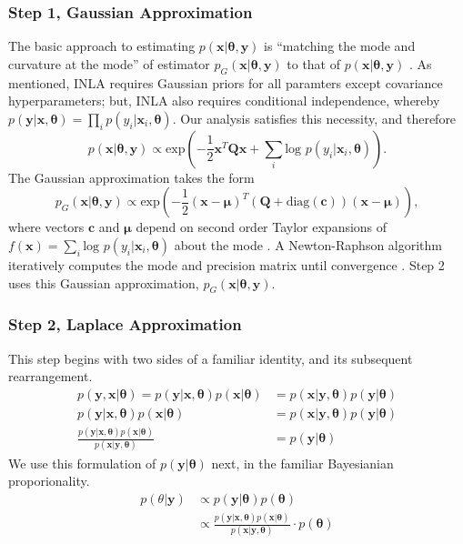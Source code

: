 \subsubsection*{Step 1, Gaussian Approximation} %

The basic approach to estimating $p(\pmb{x}|\pmb{\theta}, \pmb{y})$ is ``matching the mode and curvature at the mode'' of estimator $p_{G}(\pmb{x}|\pmb{\theta}, \pmb{y})$ to that of $p(\pmb{x}|\pmb{\theta}, \pmb{y})$ \citep{Rue2005}. As mentioned, INLA requires Gaussian priors for all paramters except covariance hyperparameters; but, INLA also requires conditional independence, whereby $p(\pmb{y}|\pmb{x}, \pmb{\theta}) = \prod_{i} p(y_{i}|\pmb{x}_{i},\pmb{\theta})$. Our analysis satisfies this necessity, and therefore $$p(\pmb{x}|\pmb{\theta},\pmb{y}) \propto \text{exp}\left(-\frac{1}{2}\pmb{x}^{T}\pmb{Q x} + \sum_{i} \text{log }p(y_{i}|\pmb{x}_{i},\pmb{\theta}) \right).$$ The Gaussian approximation takes the form
$$p_{G}(\pmb{x}|\pmb{\theta},\pmb{y}) \propto \text{exp} \left( -\frac{1}{2}(\pmb{x-\mu})^{T} (\pmb{Q} + \text{diag}(\pmb{c}) ) (\pmb{x - \mu}) \right),$$
where vectors $\pmb{c}$ and $\pmb{\mu}$ depend on second order Taylor expansions of $f(\pmb{x}) = \sum_{i} \text{log }p(y_{i}|\pmb{x}_{i},\pmb{\theta})$ about the mode \citep{Lindstrom2014}. A Newton-Raphson algorithm iteratively computes the mode and precision matrix until convergence \citep{Rue2009}. Step 2 uses this Gaussian approximation, $p_{G}(\pmb{x}|\pmb{\theta},\pmb{y})$.

\subsubsection*{Step 2, Laplace Approximation}  %

This step begins with two sides of a familiar identity, and its subsequent rearrangement.
\begin{align}
p(\pmb{y} , \pmb{x} | \pmb{\theta}) = p(\pmb{y} | \pmb{x}, \pmb{\theta}) p(\pmb{x} | \pmb{\theta})  &= p(\pmb{x} | \pmb{y}, \pmb{\theta}) p(\pmb{y} | \pmb{\theta}) \\
p(\pmb{y} | \pmb{x}, \pmb{\theta}) p(\pmb{x} | \pmb{\theta}) &= p(\pmb{x} | \pmb{y}, \pmb{\theta}) p(\pmb{y} | \pmb{\theta}) \\
\frac{p(\pmb{y} | \pmb{x}, \pmb{\theta}) p(\pmb{x} | \pmb{\theta})} {p(\pmb{x} | \pmb{y}, \pmb{\theta})} &= p(\pmb{y} | \pmb{\theta})  
\end{align}
We use this formulation of $p(\pmb{y} | \pmb{\theta})$ next, in the familiar Bayesianian proporionality.
\begin{align}
p(\theta|\pmb{y}) & \propto p(\pmb{y}|\pmb{\theta})p(\pmb{\theta}) \\
& \propto \frac{p(\pmb{y} | \pmb{x}, \pmb{\theta}) p(\pmb{x} | \pmb{\theta})}{p(\pmb{x} | \pmb{y}, \pmb{\theta})} \cdot p(\pmb{\theta})
\end{align}

